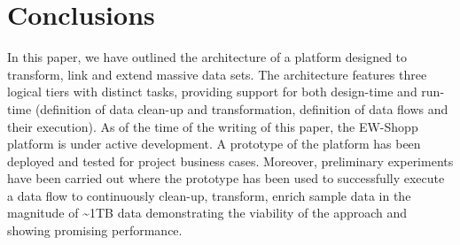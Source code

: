 \section{Conclusions}\label{sec:conclusions}
In this paper, we have outlined the architecture of a platform designed to transform, link and extend massive data sets. The architecture features three logical tiers with distinct tasks, providing support for both design-time and run-time (definition of data clean-up and transformation, definition of data flows and their execution). As of the time of the writing of this paper, the EW-Shopp platform is under active development. A prototype of the platform has been deployed and tested for project business cases. Moreover, preliminary experiments have been carried out where the prototype has been used to successfully execute a data flow to continuously clean-up, transform, enrich sample data in the magnitude of \textasciitilde 1TB data demonstrating the viability of the approach and showing promising performance.


